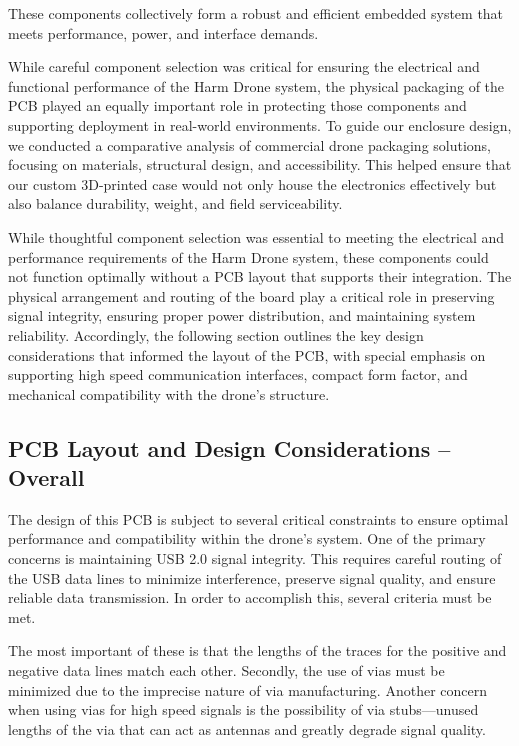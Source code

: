 \documentclass[12pt]{article}
\begin{document}
\par These components collectively form a robust and efficient embedded system that meets performance, power, and interface demands.
\par While careful component selection was critical for ensuring the electrical and functional performance of the Harm Drone system, the physical packaging of the PCB played an equally important role in protecting those components and supporting deployment in real-world environments. To guide our enclosure design, we conducted a comparative analysis of commercial drone packaging solutions, focusing on materials, structural design, and accessibility. This helped ensure that our custom 3D-printed case would not only house the electronics effectively but also balance durability, weight, and field serviceability.
\par While thoughtful component selection was essential to meeting the electrical and performance requirements of the Harm Drone system, these components could not function optimally without a PCB layout that supports their integration. The physical arrangement and routing of the board play a critical role in preserving signal integrity, ensuring proper power distribution, and maintaining system reliability. Accordingly, the following section outlines the key design considerations that informed the layout of the PCB, with special emphasis on supporting high speed communication interfaces, compact form factor, and mechanical compatibility with the drone's structure.

\subsection{PCB Layout and Design Considerations – Overall}
The design of this PCB is subject to several critical constraints to ensure optimal performance and compatibility within the drone’s system. One of the primary concerns is maintaining USB 2.0 signal integrity. This requires careful routing of the USB data lines to minimize interference, preserve signal quality, and ensure reliable data transmission. In order to accomplish this, several criteria must be met. 

\par The most important of these is that the lengths of the traces for the positive and negative data lines match each other. Secondly, the use of vias must be minimized due to the imprecise nature of via manufacturing. Another concern when using vias for high speed signals is the possibility of via stubs—unused lengths of the via that can act as antennas and greatly degrade signal quality.
\end{document}
